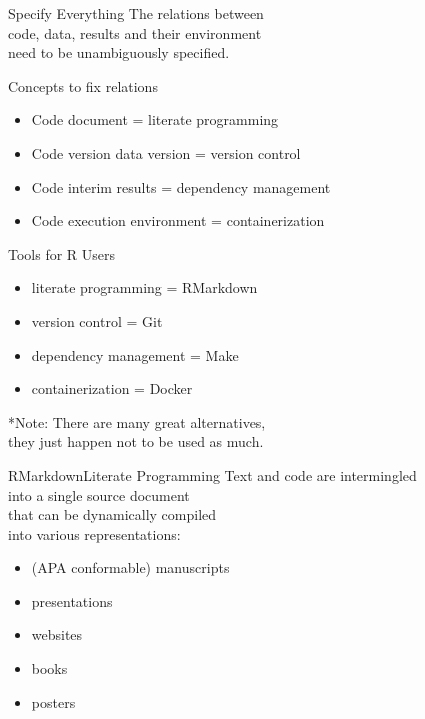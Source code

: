 \documentclass[12pt,t]{beamer}
\begin{document}
{\begin{frame}[c]{Specify Everything}
  \textcolor<3->{lolit}{The relations between\\
  \textcolor<2>{hilit}{code}, \textcolor<2>{hilit}{data}, \textcolor<2>{hilit}{results} and their \textcolor<2>{hilit}{environment}\\
  need to be \textcolor<2>{vhilit}{unambiguously} specified.\\}
  \vspace{10mm}
\end{frame}

\begin{frame}[c]{Concepts to fix relations}
  \begin{itemize}
    \item Code \textemdash{} document = literate programming
    \item Code version \textemdash{} data version = version control
    \item Code \textemdash{} interim results = dependency management
    \item Code \textemdash{} execution environment = containerization
  \end{itemize}
\end{frame}

\begin{frame}[c]{Tools for R Users}
  \begin{itemize}
    \item literate programming = RMarkdown
    \item version control = Git
    \item dependency management = Make
    \item containerization = Docker
  \end{itemize}
  \vfill
  \textcolor{lolit}{*Note: There are many great alternatives,\\they just happen not to be used as much.}
\end{frame}

\begin{frame}[c]{RMarkdown\textemdash{}Literate Programming}
  Text and code are intermingled\\
  into a single source document\\
  that can be dynamically compiled\\
  into various representations:
  \begin{itemize}
    \item (APA conformable) manuscripts
    \item presentations
    \item websites
    \item books
    \item posters
  \end{itemize}
\end{frame}

}
\end{document}
